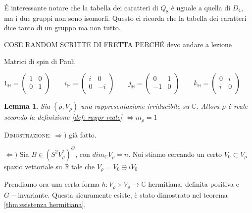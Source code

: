 \documentclass[11pt]{article}
\theoremstyle{plain}
\newtheorem{lemma}[thm]{Lemma}
\theoremstyle{definition}
\theoremstyle{remark}
\newcommand{\C}{\mathbb{C}}
\newcommand{\R}{\mathbb{R}}
\newcommand{\HH}{\mathbb{H}}
\begin{document}
\'E interessante notare che la tabella dei caratteri di $Q_8$ è uguale a quella di $D_4$, ma i due gruppi non sono isomorfi. Questo ci ricorda che la tabella dei caratteri dice tanto di un gruppo ma non tutto.


COSE RANDOM SCRITTE DI FRETTA PERCH\'E devo andare a lezione





Matrici di spin di Pauli


\[ 
1_\HH = 
\left(
\begin{array}{cc}
1 & 0 \\
0 & 1 \\
\end{array}
\right)
\qquad
i_\HH = 
\left(
\begin{array}{cc}
i & 0 \\
0 & -i \\
\end{array}
\right)
\qquad
j_\HH = 
\left(
\begin{array}{cc}
0 & 1 \\
-1 & 0 \\
\end{array}
\right)
\qquad
k_\HH =
\left(
\begin{array}{cc}
0 & i \\
i & 0 \\
\end{array}
\right)
\qquad
\]



\begin{lemma}
Sia $(\rho, V_\rho)$ una rappresentazione irriducibile su $\C$. Allora $\rho$ è reale secondo la definizione \ref{def: rappr reale} $\Leftrightarrow m_\rho = 1$ 
\end{lemma}

\textsc{Dimostrazione:} $\Rightarrow)$ già fatto.

$\Leftarrow)$ Sia $B \in (S^2V_\rho^*)^G$, con $dim_\C V_\rho = n$. Noi stiamo cercando un certo $V_0 \subset V_\rho$ spazio vettoriale su $\R$ tale che $V_\rho = V_0 \oplus i V_0$ 

Prendiamo ora una certa forma $h : V_\rho \times V_\rho \to \C$ hermitiana, definita positiva e $G-$invariante. Questa sicuramente esiste, è stato dimostrato nel teorema \ref{thm:esistenza hermitiana},
\end{document}
